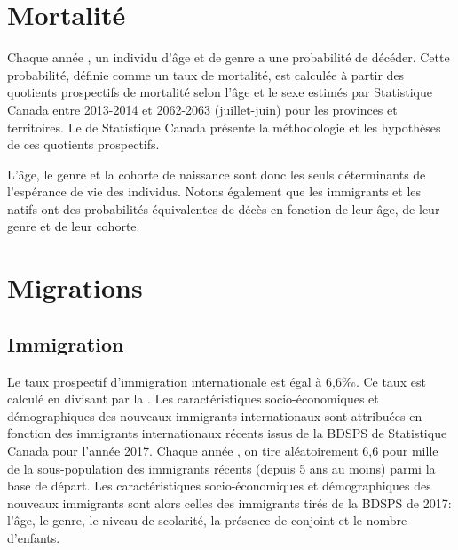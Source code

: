 \documentclass[letterpaper,10pt,french]{sphinxmanual}
\begin{document}
\section{Mortalité}
\label{\detokenize{methodologie:mortalite}}
Chaque année , un individu d’âge  et de genre  a une probabilité  de décéder. Cette probabilité, définie comme un taux de mortalité, est calculée à partir des quotients prospectifs de mortalité selon l’âge et le sexe estimés par Statistique Canada entre 2013-2014 et 2062-2063 (juillet-juin) pour les provinces et territoires. Le  de Statistique Canada présente la méthodologie et les hypothèses de ces quotients prospectifs.

L’âge, le genre et la cohorte de naissance sont donc les seuls déterminants de l’espérance de vie des individus. Notons également que les immigrants et les natifs ont des probabilités équivalentes de décès en fonction de leur âge, de leur genre et de leur cohorte.


\section{Migrations}
\label{\detokenize{methodologie:migrations}}

\subsection{Immigration}
\label{\detokenize{methodologie:immigration}}
Le taux prospectif d’immigration internationale est égal à 6,6‰. Ce taux est calculé en divisant  par la . Les caractéristiques socio-économiques et démographiques des nouveaux immigrants internationaux sont attribuées en fonction des immigrants internationaux récents issus de la BDSPS de Statistique Canada pour l’année 2017. Chaque année , on tire aléatoirement 6,6 pour mille de la sous-population des immigrants récents (depuis 5 ans au moins) parmi la base de départ. Les caractéristiques socio-économiques et démographiques des nouveaux immigrants sont alors celles des immigrants tirés de la BDSPS de 2017: l’âge, le genre, le niveau de scolarité, la présence de conjoint et le nombre d’enfants.
\end{document}
